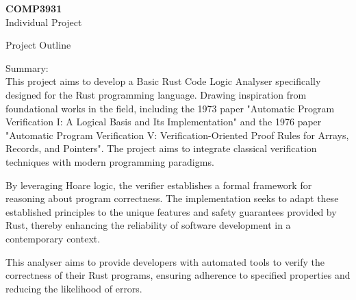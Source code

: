 \documentclass[11pt,a4paper]{article}
\begin{document}
\pagestyle{fancy}

\newcommand{\vect}[1]{\underline{\boldsymbol{#1}}}
\newcommand{\headingtitle}[1]{\textbf{#1}\normalsize\\}
\newcommand{\keyword}[1]{\colorbox{lightgray}{\texttt{#1}}}
\begin{center}
    \textbf{COMP3931}\\
    Individual Project\\
\end{center}
\vspace{11pt}
\begin{center}
    Project Outline
    \vspace{11pt}
\end{center}

Summary:\\
This project aims to develop a Basic Rust Code Logic Analyser specifically 
designed for the Rust programming language. Drawing inspiration from foundational 
works in the field, including the 1973 paper "Automatic Program Verification I: 
A Logical Basis and Its Implementation" and the 1976 paper "Automatic Program 
Verification V: Verification-Oriented Proof Rules for Arrays, Records, and Pointers".
The project aims to integrate classical verification techniques with modern 
programming paradigms.

By leveraging Hoare logic, the verifier establishes a formal 
framework for reasoning about program correctness. The implementation seeks to 
adapt these established principles to the unique features and safety guarantees 
provided by Rust, thereby enhancing the reliability of software development in a 
contemporary context.

This analyser aims to provide developers with automated tools to verify the correctness
of their Rust programs, ensuring adherence to specified properties and reducing 
the likelihood of errors.


\end{document}
